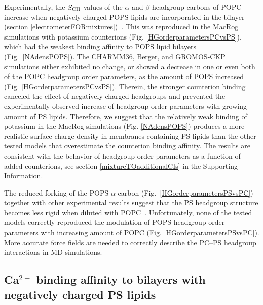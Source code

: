 \documentclass[journal=jpcbfk,manuscript=article]{achemso}
\begin{document}
Experimentally, the $S_{\rm{CH}}$ values of the $\alpha$ and $\beta$ headgroup carbons of POPC increase when negatively charged POPS lipids are incorporated in the bilayer 
(section \ref{electrometerFORmixtures})~\cite{seelig87,scherer87}.
This was reproduced in the MacRog simulations with potassium counterions (Fig. \ref{HGorderparametersPCvsPS}),
which had the weakest binding affinity to POPS lipid bilayers (Fig.~\ref{NAdensPOPS}).
The CHARMM36, Berger, and GROMOS-CKP simulations either exhibited no change, or showed a decrease
in one or even both of the POPC headgroup order parameters, as the amount of POPS increased (Fig. \ref{HGorderparametersPCvsPS}).
Therein, the stronger counterion binding canceled
the effect of negatively charged headgroups and prevented the experimentally observed
increase of headgroup order parameters with growing amount of PS lipids.
Therefore, we suggest that the relatively weak binding of potassium
in the MacRog simulations (Fig. \ref{NAdensPOPS}) produces a more
realistic surface charge density in membranes containing PS lipids
than the other tested models that overestimate the counterion
binding affinity. The results are consistent with the behavior of headgroup order
parameters as a function of added counterions, see section \ref{mixtureTOadditionalCIs}
in the Supporting Information.

The reduced forking of the POPS $\alpha$-carbon (Fig.~\ref{HGorderparametersPSvsPC})
together with other experimental results suggest that the PS headgroup structure becomes less rigid when diluted with
POPC~\cite{browning80,buldt81,roux90,roux91,scherer87}.
Unfortunately, none of the tested models correctly reproduced the modulation of POPS headgroup order
parameters with increasing amount of POPC %
(Fig. \ref{HGorderparametersPSvsPC}).
More accurate force fields are needed
to correctly describe the PC--PS headgroup interactions in MD simulations.

\subsection{Ca$^{2+}$ binding affinity to bilayers with negatively charged PS lipids}
\end{document}
